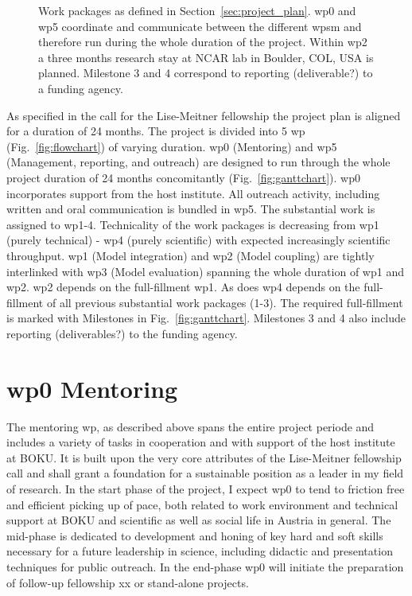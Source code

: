 \begin{figure}
  \centering
  \caption{Work packages as defined in Section~\ref{sec:project_plan}. \gls{wp}0 and \gls{wp}5 coordinate and communicate between the different \glspl{wp}m and therefore run during the whole duration of the project. Within \gls{wp}2 a three months research stay at NCAR lab in Boulder, COL, USA is planned. Milestone 3 and 4 correspond to reporting (deliverable?) to a funding agency.
}
\end{figure}

As specified in the call for the Lise-Meitner fellowship the project plan is aligned for a duration of 24 months. The project is divided into 5 \gls{wp} (Fig.~\ref{fig:flowchart}) of varying duration. \gls{wp}0 (Mentoring) and \gls{wp}5 (Management, reporting, and outreach) are designed to run through the whole project duration of 24 months concomitantly (Fig.~\ref{fig:ganttchart}). \gls{wp}0 incorporates support from the host institute. All outreach activity, including written and oral communication  is bundled in \gls{wp}5. The substantial work is assigned to \gls{wp}1-4. Technicality of the work packages is decreasing from \gls{wp}1 (purely technical) - \gls{wp}4 (purely scientific) with expected increasingly scientific throughput. \gls{wp}1 (Model integration) and \gls{wp}2 (Model coupling) are tightly interlinked with \gls{wp}3 (Model evaluation) spanning the whole duration of \gls{wp}1 and \gls{wp}2. \gls{wp}2 depends on the full-fillment \gls{wp}1. As does \gls{wp}4 depends on the full-fillment of all previous substantial work packages (1-3). The required full-fillment is marked with Milestones in Fig.~\ref{fig:ganttchart}. Milestones 3 and 4 also include reporting (deliverables?) to the funding agency.
 
\section*{\gls{wp}0 Mentoring}
\label{ssec:wp0}
The mentoring \gls{wp}, as described above spans the entire project periode and includes a variety of tasks in cooperation and with support of the host institute at BOKU. It is built upon the very core attributes of the Lise-Meitner fellowship call and shall grant a foundation for a sustainable position as a leader in my field of research. In the start phase of the project, I expect \gls{wp}0 to tend to friction free and efficient picking up of pace, both related to work environment and technical support at BOKU and scientific as well as social life in Austria in general. The mid-phase is dedicated to development and honing of key hard and soft skills necessary for a future leadership in science, including didactic and presentation techniques for public outreach. In the end-phase \gls{wp}0 will initiate the preparation of follow-up fellowship xx or stand-alone projects.

